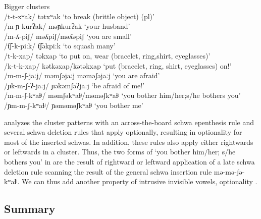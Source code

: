\documentclass[output=paper,colorlinks,citecolor=brown]{langscibook}
\begin{document}
\TabPositions{2.5cm, 6.4cm,8cm,10cm}
\begin{exe}
    \ex \label{ex17}Bigger clusters\\
    /t-t-xʷak/   \tab   tətxʷak     \tab   ‘to break (brittle object) (pl)’\\
    /m-ɲ{}-kurʔak/ \tab  məɲkurʔak    \tab     ‘your husband’\\
    /m-ʎ{}-piʃ/  \tab  məʎpiʃ/məʎəpiʃ     \tab  ‘you are small’\\
    /t͡ʃ-k-piːk/  \tab   t͡ʃəkpiːk     \tab       ‘to squash many’\\
    /t-k-xap/   \tab    təkxap   \tab         ‘to put on, wear (bracelet, ring,\tab \tab \tab shirt,  eyeglasses)’\\
    /k-t-k-xap/  \tab   kətkəxap/kətəkxap  \tab   ‘put (bracelet, ring, shirt, eyeglasses) \tab \tab \tab  on!’\\
    /m-m-ʃ{}-jaːj/  \tab    məmʃəjaːj məməʃəjaːj \tab  ‘you are afraid’\\
    /ɲk-m-ʃ{}-ʔ{}-jaːj/ \tab ɲəkəmʃəʔjaːj    \tab       ‘be afraid of me!’\\
    /m-m-ʃ{}-kʷaɬʲ/   \tab məmʃəkʷaɬʲ/məməʃkʷaɬʲ \tab ‘you bother him/her;\tab \tab \tab \tab  s/he bothers you’\\
    /ɲm{}-m-ʃ{}-kʷaɬʲ/ \tab ɲəməməʃkʷaɬʲ  \tab    ‘you bother me’
\end{exe}

\citet{Miller2001} analyzes the cluster patterns with an across{}-the{}-board schwa epenthesis rule and several schwa deletion rules that apply optionally, resulting in optionality for most of the inserted schwas. In addition, these rules also apply either rightwards or leftwards in a cluster. Thus, the two forms of ‘you bother him/her; s/he bothers you’ in  are the result of rightward or leftward application of a late schwa deletion rule scanning the result of the general schwa insertion rule {\textbar}mə{}-mə{}-ʃə{}-kʷaɬʲ{\textbar}. We can thus add another property of intrusive invisible vowels, optionality .

\subsection{Summary}\label{summy}
\end{document}
